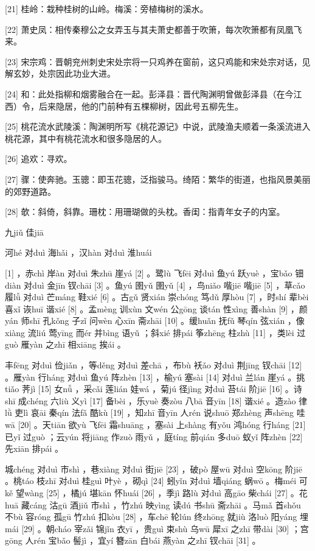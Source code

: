 \documentclass[12pt,UTF8]{ctexbook}
\begin{document}
[21] 桂岭：栽种桂树的山岭。梅溪：旁植梅树的溪水。

[22] 萧史凤：相传秦穆公之女弄玉与其夫萧史都善于吹箫，每次吹箫都有凤凰飞来。

[23] 宋宗鸡：晋朝兖州刺史宋处宗将一只鸡养在窗前，这只鸡能和宋处宗对话，见解玄妙，处宗因此功业大进。

[24] 和：此处指柳和烟雾融合在一起。彭泽县：晋代陶渊明曾做彭泽县（在今江西）令，后来隐居，他的门前种有五棵柳树，因此号五柳先生。

[25] 桃花流水武陵溪：陶渊明所写《桃花源记》中说，武陵渔夫顺着一条溪流进入桃花源，其中有桃花流水和很多隐居的人。

[26] 追欢：寻欢。

[27] 骤：使奔驰。玉骢：即玉花骢，泛指骏马。绮陌：繁华的街道，也指风景美丽的郊野道路。

[28] 欹：斜倚，斜靠。珊枕：用珊瑚做的头枕。香闺：指青年女子的内室。





九jiǔ 佳jiā


河hé 对duì 海hǎi ，汉hàn 对duì 淮huái





[1] ，赤chì 岸àn 对duì 朱zhū 崖yá [2] 。鹭lù 飞fēi 对duì 鱼yú 跃yuè ，宝bǎo 钿diàn 对duì 金jīn 钗chāi [3] 。鱼yú 圉yǔ 圉yǔ [4] ，鸟niǎo 喈jiē 喈jiē [5] ，草cǎo 履lǚ 对duì 芒máng 鞋xié [6] 。古gǔ 贤xián 崇chóng 笃dǔ 厚hòu [7] ，时shí 辈bèi 喜xǐ 诙huī 谐xié [8] 。孟mèng 训xùn 文wén 公gōng 谈tán 性xìng 善shàn [9] ，颜yán 师shī 孔kǒng 子zǐ 问wèn 心xīn 斋zhāi [10] 。缓huǎn 抚fǔ 琴qín 弦xián ，像xiàng 流liú 莺yīng 而ér 并bìng 语yǔ ；斜xié 排pái 筝zhēng 柱zhù [11] ，类lèi 过guò 雁yàn 之zhī 相xiāng 挨ái 。

丰fēng 对duì 俭jiǎn ，等děng 对duì 差chā ，布bù 袄ǎo 对duì 荆jīng 钗chāi [12] 。雁yàn 行háng 对duì 鱼yú 阵zhèn [13] ，榆yú 塞sài [14] 对duì 兰lán 崖yá 。挑tiǎo 荠jì [15] 女nǚ ，采cǎi 莲lián 娃wá ，菊jú 径jìng 对duì 苔tái 阶jiē [16] 。诗shī 成chéng 六liù 义yì [17] 备bèi ，乐yuè 奏zòu 八bā 音yīn [18] 谐xié 。造zào 律lǜ 吏lì 哀āi 秦qín 法fǎ 酷kù [19] ，知zhī 音yīn 人rén 说shuō 郑zhèng 声shēng 哇wā [20] 。天tiān 欲yù 飞fēi 霜shuāng ，塞sài 上shàng 有yǒu 鸿hóng 行háng [21] 已yǐ 过guò ；云yún 将jiāng 作zuò 雨yǔ ，庭tíng 前qián 多duō 蚁yǐ 阵zhèn [22] 先xiān 排pái 。

城chéng 对duì 市shì ，巷xiàng 对duì 街jiē [23] ，破pò 屋wū 对duì 空kōng 阶jiē 。桃táo 枝zhī 对duì 桂guì 叶yè ，砌qì [24] 蚓yǐn 对duì 墙qiáng 蜗wō 。梅méi 可kě 望wàng [25] ，橘jú 堪kān 怀huái [26] ，季jì 路lù 对duì 高gāo 柴chái [27] 。花huā 藏cáng 沽gū 酒jiǔ 市shì ，竹zhú 映yìng 读dú 书shū 斋zhāi 。马mǎ 首shǒu 不bù 容róng 孤gū 竹zhú 扣kòu [28] ，车chē 轮lún 终zhōng 就jiù 洛luò 阳yáng 埋mái [29] 。朝cháo 宰zǎi 锦jǐn 衣yī ，贵guì 束shù 乌wū 犀xī 之zhī 带dài [30] ；宫gōng 人rén 宝bǎo 髻jì ，宜yí 簪zān 白bái 燕yàn 之zhī 钗chāi [31] 。
\end{document}

